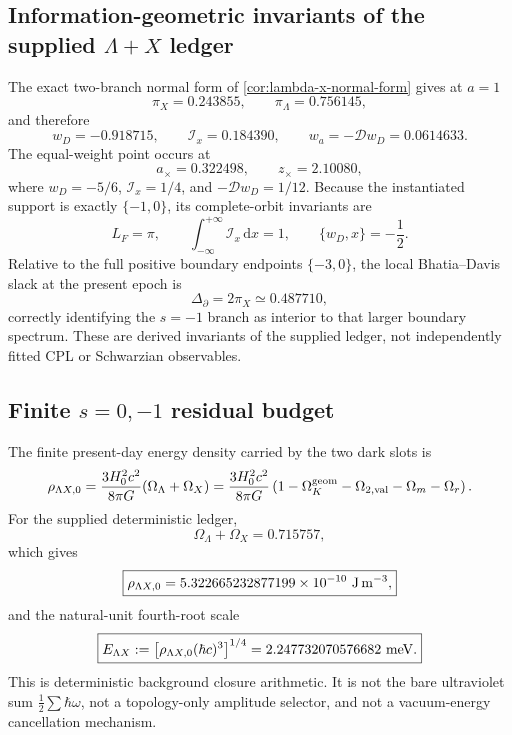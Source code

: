 \documentclass[aps,prd,preprint,onecolumn,nofootinbib,superscriptaddress,showkeys]{revtex4-2}
\numberwithin{equation}{section}
\theoremstyle{definition}
\theoremstyle{plain}
\newcommand{\dd}{\mathrm d}
\newcommand{\Dil}{\mathscr D}
\begin{document}
\subsection{Information-geometric invariants of the supplied \texorpdfstring{$\Lambda+X$}{Lambda+X} ledger}

The exact two-branch normal form of \cref{cor:lambda-x-normal-form} gives at \(a=1\)
\begin{equation}
\pi_X=0.243855,
\qquad
\pi_\Lambda=0.756145,
\end{equation}
and therefore
\begin{equation}
\boxed{
w_D=-0.918715,
\qquad
\mathcal I_x=0.184390,
\qquad
w_a=-\Dil w_D=0.0614633.
}
\end{equation}
The equal-weight point occurs at
\begin{equation}
a_\times=0.322498,
\qquad
\boxed{z_\times=2.10080},
\end{equation}
where \(w_D=-5/6\), \(\mathcal I_x=1/4\), and \(-\Dil w_D=1/12\).  Because the instantiated support is exactly \(\{-1,0\}\), its complete-orbit invariants are
\begin{equation}
\boxed{
L_F=\pi,
\qquad
\int_{-\infty}^{+\infty}\mathcal I_x\,\dd x=1,
\qquad
\{w_D,x\}=-\frac12.
}
\end{equation}
Relative to the full positive boundary endpoints \(\{-3,0\}\), the local Bhatia--Davis slack at the present epoch is
\begin{equation}
\Delta_\partial=2\pi_X\simeq0.487710,
\end{equation}
correctly identifying the \(s=-1\) branch as interior to that larger boundary spectrum.  These are derived invariants of the supplied ledger, not independently fitted CPL or Schwarzian observables.

\subsection{Finite \texorpdfstring{$s=0,-1$}{s=0,-1} residual budget}

The finite present-day energy density carried by the two dark slots is
\begin{equation}
\rho_{\Lambda X,0}
=
\frac{3H_0^2c^2}{8\pi G}(\Omega_\Lambda+\Omega_X)
=
\frac{3H_0^2c^2}{8\pi G}
\left(1-\Omega_K^{\rm geom}-\Omega_{2,{\rm val}}-\Omega_m-\Omega_r\right).
\end{equation}
For the supplied deterministic ledger,
\begin{equation}
\Omega_\Lambda+\Omega_X=0.715757,
\end{equation}
which gives
\begin{equation}
\boxed{
\rho_{\Lambda X,0}=5.322665232877199\times10^{-10}\ {\rm J\,m^{-3}},
}
\end{equation}
and the natural-unit fourth-root scale
\begin{equation}
\boxed{
E_{\Lambda X}
:=\bigl[\rho_{\Lambda X,0}(\hbar c)^3\bigr]^{1/4}
=2.247732070576682\ {\rm meV}.
}
\end{equation}
This is deterministic background closure arithmetic.  It is not the bare ultraviolet sum \(\frac12\sum\hbar\omega\), not a topology-only amplitude selector, and not a vacuum-energy cancellation mechanism.
\end{document}
